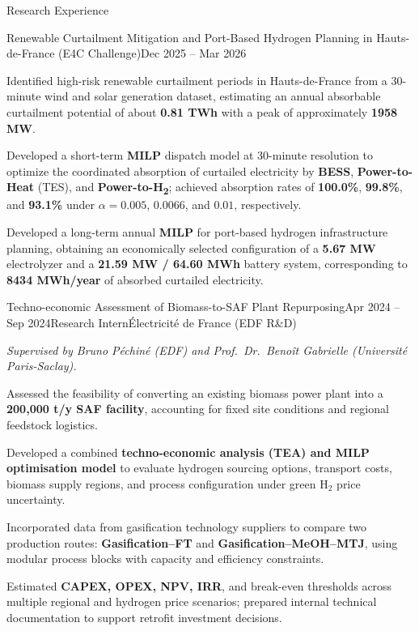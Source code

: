 \documentclass{resume}
\begin{document}
\begin{rSection}{Research Experience}

\begin{rSubsection}{Renewable Curtailment Mitigation and Port-Based Hydrogen Planning in Hauts-de-France (E4C Challenge)}{Dec 2025 -- Mar 2026}{}{}
\item Identified high-risk renewable curtailment periods in Hauts-de-France from a 30-minute wind and solar generation dataset, estimating an annual absorbable curtailment potential of about \textbf{0.81 TWh} with a peak of approximately \textbf{1958 MW}.
\item Developed a short-term \textbf{MILP} dispatch model at 30-minute resolution to optimize the coordinated absorption of curtailed electricity by \textbf{BESS}, \textbf{Power-to-Heat} (TES), and \textbf{Power-to-H\textsubscript{2}}; achieved absorption rates of \textbf{100.0\%}, \textbf{99.8\%}, and \textbf{93.1\%} under $\alpha=0.005$, $0.0066$, and $0.01$, respectively.
\item Developed a long-term annual \textbf{MILP} for port-based hydrogen infrastructure planning, obtaining an economically selected configuration of a \textbf{5.67 MW} electrolyzer and a \textbf{21.59 MW / 64.60 MWh} battery system, corresponding to \textbf{8434 MWh/year} of absorbed curtailed electricity.
\end{rSubsection}


\begin{rSubsection}{Techno-economic Assessment of Biomass-to-SAF Plant Repurposing}{Apr 2024 -- Sep 2024}{Research Intern}{\'Electricit\'e de France (EDF R\&D)}
\item[] \textit{Supervised by Bruno P\'echin\'e (EDF) and Prof.\ Dr.\ Beno\^it Gabrielle (Universit\'e Paris-Saclay).}
\item Assessed the feasibility of converting an existing biomass power plant into a \textbf{200{,}000 t/y SAF facility}, accounting for fixed site conditions and regional feedstock logistics.
\item Developed a combined \textbf{techno-economic analysis (TEA) and MILP optimisation model} to evaluate hydrogen sourcing options, transport costs, biomass supply regions, and process configuration under green H$_2$ price uncertainty.
\item Incorporated data from gasification technology suppliers to compare two production routes: \textbf{Gasification--FT} and \textbf{Gasification--MeOH--MTJ}, using modular process blocks with capacity and efficiency constraints.
\item Estimated \textbf{CAPEX, OPEX, NPV, IRR}, and break-even thresholds across multiple regional and hydrogen price scenarios; prepared internal technical documentation to support retrofit investment decisions.
\end{rSubsection}


\end{rSection}
\end{document}
